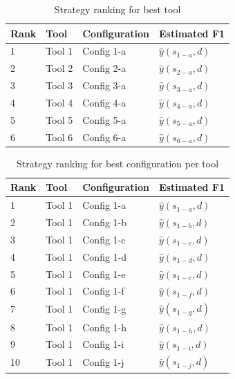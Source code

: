 \begin{table}[]
\centering
\begin{tabular}{|l|l|l|l|}
\hline
\textbf{Rank} & \textbf{Tool} & \textbf{Configuration} & \textbf{Estimated F1} \\ \hline
1             & Tool 1        & Config 1-a             & $\hat{y}(s_{1-a}, d)$ \\ \hline
2             & Tool 2        & Config 2-a             & $\hat{y}(s_{2-a}, d)$ \\ \hline
3             & Tool 3        & Config 3-a             & $\hat{y}(s_{3-a}, d)$ \\ \hline
4             & Tool 4        & Config 4-a             & $\hat{y}(s_{4-a}, d)$ \\ \hline
5             & Tool 5        & Config 5-a             & $\hat{y}(s_{5-a}, d)$ \\ \hline
6             & Tool 6        & Config 6-a             & $\hat{y}(s_{6-a}, d)$ \\ \hline
\end{tabular}
\caption{Strategy ranking for best tool}
\label{tab:ranking_best_tool}
\end{table}


\begin{table}[]
\centering
\begin{tabular}{|l|l|l|l|}
\hline
\textbf{Rank} & \textbf{Tool} & \textbf{Configuration} & \textbf{Estimated F1} \\ \hline
1             & Tool 1        & Config 1-a             & $\hat{y}(s_{1-a}, d)$ \\ \hline
2             & Tool 1        & Config 1-b             & $\hat{y}(s_{1-b}, d)$ \\ \hline
3             & Tool 1        & Config 1-c             & $\hat{y}(s_{1-c}, d)$ \\ \hline
4             & Tool 1        & Config 1-d             & $\hat{y}(s_{1-d}, d)$ \\ \hline
5             & Tool 1        & Config 1-e             & $\hat{y}(s_{1-e}, d)$ \\ \hline
6             & Tool 1        & Config 1-f             & $\hat{y}(s_{1-f}, d)$ \\ \hline
7             & Tool 1        & Config 1-g             & $\hat{y}(s_{1-g}, d)$ \\ \hline
8             & Tool 1        & Config 1-h             & $\hat{y}(s_{1-h}, d)$ \\ \hline
9             & Tool 1        & Config 1-i             & $\hat{y}(s_{1-i}, d)$ \\ \hline
10            & Tool 1        & Config 1-j             & $\hat{y}(s_{1-j}, d)$ \\ \hline
\end{tabular}
\caption{Strategy ranking for best configuration per tool}
\label{tab:ranking_best_configuration}
\end{table}

